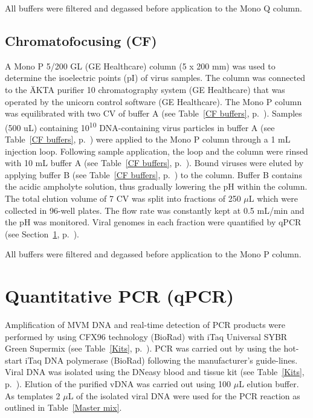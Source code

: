 All buffers were filtered and degassed before application to the Mono Q\textsuperscript{\texttrademark} column.



\subsection{Chromatofocusing (CF)}
\label{CF}

A Mono P\textsuperscript{\texttrademark} 5/200 GL (GE Healthcare) column (5 x 200 mm) was used to determine the isoelectric points (pI) of virus samples.  The column was connected to the ÄKTA purifier 10 chromatography system (GE Healthcare) that was operated by the unicorn control software (GE Healthcare). The Mono P\textsuperscript{\texttrademark} column was equilibrated with two CV of buffer A (see Table~\ref{CF buffers}, p.~\pageref{CF buffers}). Samples (500 uL) containing 10\textsuperscript{10} DNA-containing virus particles in buffer A (see Table~\ref{CF buffers}, p.~\pageref{CF buffers}) were applied to the Mono P\textsuperscript{\texttrademark} column through a 1 mL injection loop. Following sample application, the loop and the column were rinsed with 10 mL buffer A (see Table~\ref{CF buffers}, p.~\pageref{CF buffers}). Bound viruses were eluted by applying buffer B (see Table~\ref{CF buffers}, p.~\pageref{CF buffers}) to the column. Buffer B contains the acidic ampholyte solution, thus gradually lowering the pH within the column. The total elution volume of 7 CV was split into fractions of 250 $\mu$L which were collected in 96-well plates. The flow rate was constantly kept at 0.5 mL/min and the pH was monitored. Viral genomes in each fraction were quantified by qPCR (see Section~\ref{qPCR}, p.~\pageref{qPCR}).      

All buffers were filtered and degassed before application to the Mono P\textsuperscript{\texttrademark} column.


\section{Quantitative PCR (qPCR)}
\label{qPCR}
Amplification of MVM DNA and real-time detection of PCR products were performed by using CFX96 technology (BioRad) with iTaq\textsuperscript{\texttrademark} Universal SYBR\textsuperscript{\textregistered} Green Supermix (see Table~\ref{Kits}, p.~\pageref{Kits}). PCR was carried out by using the hot-start iTaq\textsuperscript{\texttrademark} DNA polymerase (BioRad) following the manufacturer’s guide-lines. Viral DNA was isolated using the DNeasy blood and tissue kit (see Table~\ref{Kits}, p.~\pageref{Kits}). Elution of the purified vDNA was carried out using 100 $\mu$L elution buffer. As templates 2 $\mu$L of the isolated viral DNA were used for the PCR reaction as outlined in Table~\ref{Master mix}.\\

